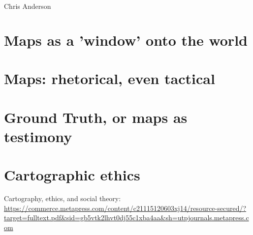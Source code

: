\documentclass[11pt]{report}
\begin{document}
Chris Anderson 

\section{Maps as a 'window' onto the world}
\section{Maps: rhetorical, even tactical}
\section{Ground Truth, or maps as testimony}

\section{Cartographic ethics}

Cartography, ethics, and social theory: \url{https://commerce.metapress.com/content/c21115120603xj14/resource-secured/?target=fulltext.pdf&sid=gb5vtk2lhvt0dj55c1xba4aa&sh=utpjournals.metapress.com}

\end{document}
